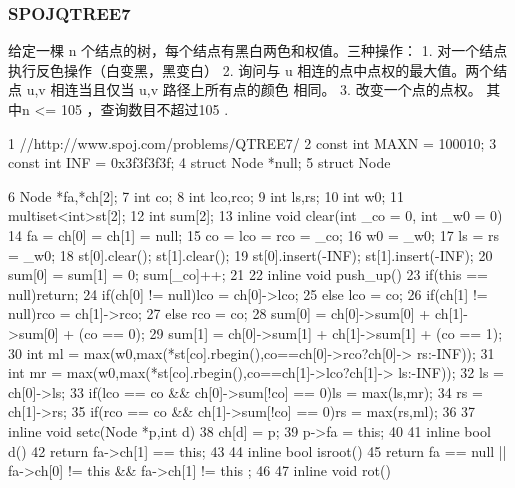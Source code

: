 \documentclass[11pt]{article}
\begin{document}
\subsubsection{SPOJQTREE7}

\begin{Code}
      给定一棵 n 个结点的树，每个结点有黑白两色和权值。三种操作：
      1. 对一个结点执行反色操作（白变黑，黑变白）
      2. 询问与 u 相连的点中点权的最大值。两个结点 u,v 相连当且仅当 u,v 路径上所有点的颜色
      相同。
      3. 改变一个点的点权。
      其中n <= 105 ，查询数目不超过105 .


 1   //http://www.spoj.com/problems/QTREE7/
 2   const int MAXN = 100010;
 3   const int INF = 0x3f3f3f3f;
 4   struct Node *null;
 5   struct Node{
 6       Node *fa,*ch[2];
 7       int co;
 8       int lco,rco;
 9       int ls,rs;
10       int w0;
11       multiset<int>st[2];
12       int sum[2];
13       inline void clear(int _co = 0, int _w0 = 0){
14           fa = ch[0] = ch[1] = null;
15           co = lco = rco = _co;
16           w0 = _w0;
17           ls = rs = _w0;
18           st[0].clear(); st[1].clear();
19           st[0].insert(-INF); st[1].insert(-INF);
20           sum[0] = sum[1] = 0; sum[_co]++;
21       }
22       inline void push_up(){
23           if(this == null)return;
24           if(ch[0] != null)lco = ch[0]->lco;
25           else lco = co;
26           if(ch[1] != null)rco = ch[1]->rco;
27           else rco = co;
28           sum[0] = ch[0]->sum[0] + ch[1]->sum[0] + (co == 0);
29           sum[1] = ch[0]->sum[1] + ch[1]->sum[1] + (co == 1);
30           int ml = max(w0,max(*st[co].rbegin(),co==ch[0]->rco?ch[0]->
                rs:-INF));
31           int mr = max(w0,max(*st[co].rbegin(),co==ch[1]->lco?ch[1]->
                ls:-INF));
32           ls = ch[0]->ls;
33           if(lco == co && ch[0]->sum[!co] == 0)ls = max(ls,mr);
34           rs = ch[1]->rs;
35           if(rco == co && ch[1]->sum[!co] == 0)rs = max(rs,ml);
36       }
37       inline void setc(Node *p,int d){
38           ch[d] = p;
39           p->fa = this;
40       }
41       inline bool d(){
42           return fa->ch[1] == this;
43       }
44       inline bool isroot(){
45           return fa == null || fa->ch[0] != this && fa->ch[1] != this
                ;
46       }
47       inline void rot(){


}}
\end{Code}
\end{document}

